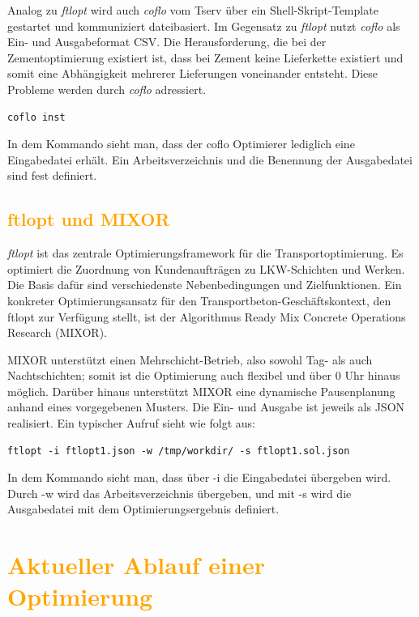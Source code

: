 \documentclass[
    12pt,               
    a4paper,            
    ngerman,            
    parskip=half,       
    headings=normal,   
    numbers=enddot,     
    toc=chapterentrywithdots 
]{scrreprt}\usepackage[utf8]{inputenc}
\begin{document}
Analog zu \textit{ftlopt} wird auch \textit{coflo} vom Tserv über ein Shell-Skript-Template gestartet und kommuniziert dateibasiert. Im Gegensatz zu \textit{ftlopt} nutzt \textit{coflo} als Ein- und Ausgabeformat CSV. Die Herausforderung, die bei der Zementoptimierung existiert ist, dass bei Zement keine Lieferkette existiert und somit eine Abhängigkeit mehrerer Lieferungen voneinander entsteht. Diese Probleme werden durch  \textit{coflo} adressiert.

\begin{verbatim}
coflo inst
\end{verbatim}

In dem Kommando sieht man, dass der coflo Optimierer lediglich eine Eingabedatei erhält. Ein Arbeitsverzeichnis und die Benennung der Ausgabedatei sind fest definiert.

\subsection{\textcolor{orange}{ftlopt und MIXOR}}
\textit{ftlopt} ist das zentrale Optimierungsframework für die Transportoptimierung. Es optimiert die Zuordnung von Kundenaufträgen zu LKW-Schichten und Werken. Die Basis dafür sind verschiedenste Nebenbedingungen und Zielfunktionen. Ein konkreter Optimierungsansatz für den Transportbeton-Geschäftskontext, den ftlopt zur Verfügung stellt, ist der Algorithmus Ready Mix Concrete Operations Research (MIXOR).

MIXOR unterstützt einen Mehrschicht-Betrieb, also sowohl Tag- als auch Nachtschichten; somit ist die Optimierung auch flexibel und über 0 Uhr hinaus möglich. Darüber hinaus unterstützt MIXOR eine dynamische Pausenplanung anhand eines vorgegebenen Musters. Die Ein- und Ausgabe ist jeweils als JSON realisiert. Ein typischer Aufruf sieht wie folgt aus:

\begin{verbatim}
ftlopt -i ftlopt1.json -w /tmp/workdir/ -s ftlopt1.sol.json
\end{verbatim}

In dem Kommando sieht man, dass über -i die Eingabedatei übergeben wird. Durch -w wird das Arbeitsverzeichnis übergeben, und mit -s wird die Ausgabedatei mit dem Optimierungsergebnis definiert.

\section{\textcolor{orange}{Aktueller Ablauf einer Optimierung}}
\end{document}
